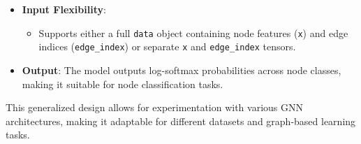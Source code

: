 {\begin{itemize}
		\item \textbf{Input Flexibility}:
		\begin{itemize}
			\item Supports either a full \texttt{data} object containing node features (\texttt{x}) and edge indices (\texttt{edge\_index}) or separate \texttt{x} and \texttt{edge\_index} tensors.
		\end{itemize}
		
		\item \textbf{Output}: The model outputs log-softmax probabilities across node classes, making it suitable for node classification tasks.
	\end{itemize}
	
	This generalized design allows for experimentation with various GNN architectures, making it adaptable for different datasets and graph-based learning tasks.
	}
	
